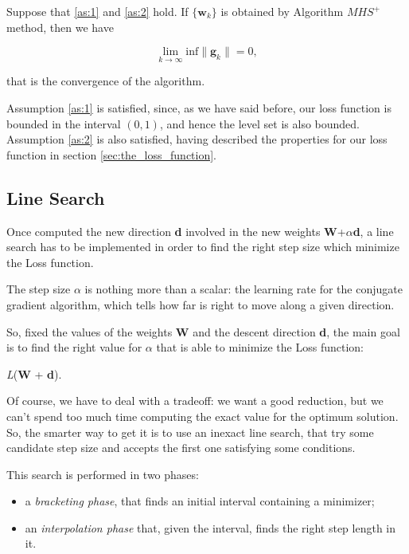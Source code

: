 			\begin{theorem}
				Suppose that \ref{as:1} and \ref{as:2} hold. If $\{\textbf{w}_k\}$ is obtained by Algorithm $MHS^+$ method, then we have
			\end{theorem}

			\begin{equation}
			\label{conv_mhs}
			  \lim_{k \to \infty} \text{inf} \|\textbf{g}_k\| = 0,
			\end{equation}

			that is the convergence of the algorithm.

			Assumption \ref{as:1} is satisfied, since, as we have said before, our loss function is bounded in the
			interval $(0, 1)$, and hence the level set is also bounded. Assumption \ref{as:2} is also satisfied,
			having described the properties for our loss function in section \ref{sec:the_loss_function}.

		\subsection{Line Search}
		\label{sub:line_search}
			Once computed the new direction \textbf{d} involved in the new weights \textbf{W}+$\alpha$\textbf{d}, a line search has to be implemented in order to find the right step size which minimize the Loss function.

			The step size $\alpha$ is nothing more than a scalar: the learning rate for the conjugate gradient algorithm, which tells how far is right to move along a given direction.

			So, fixed the values of the weights \textbf{W} and the descent direction \textbf{d}, the main goal is to find the right value for $\alpha$ that is able to minimize the Loss function:

			 \begin{mini}
			   {\alpha}{\textit{L}(\textbf{W} + \alpha\textbf{d}).}{}{}
			 \end{mini}

			Of course, we have to deal with a tradeoff: we want a good reduction, but we can't spend too much time computing the exact value for the optimum solution. So, the smarter way to get it is to use an inexact line search, that try some candidate step size and accepts the first one satisfying some conditions.

			This search is performed in two phases:
			\begin{itemize}
			\item a \textit{bracketing phase}, that finds an initial interval containing a minimizer;
			\item an \textit{interpolation phase} that, given the interval, finds the right step length in it.
			\end{itemize}

